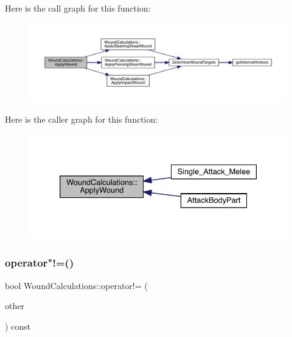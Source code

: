 Here is the call graph for this function\+:
\nopagebreak
\begin{figure}[H]
\begin{center}
\leavevmode
\includegraphics[width=350pt]{db/d1e/class_wound_calculations_a8143ba01702cf1a1072d17ee7deab4e0_cgraph}
\end{center}
\end{figure}
Here is the caller graph for this function\+:
\nopagebreak
\begin{figure}[H]
\begin{center}
\leavevmode
\includegraphics[width=333pt]{db/d1e/class_wound_calculations_a8143ba01702cf1a1072d17ee7deab4e0_icgraph}
\end{center}
\end{figure}
\mbox{\label{class_wound_calculations_ad2b94568adacf5e0d0ede9fa639de88c}} 
\subsubsection{\texorpdfstring{operator"!=()}{operator!=()}}
{\footnotesize\ttfamily bool Wound\+Calculations\+::operator!= (\begin{DoxyParamCaption}\item[{\mbox{\hyperlink{class_wound_calculations}{Wound\+Calculations}} \&}]{other }\end{DoxyParamCaption}) const}

\mbox{\label{class_wound_calculations_a539972ef16a667af23ccdd51246277f3}} 
